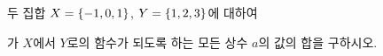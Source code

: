 두 집합 $X=\{-1{,}\mkern3mu\mathopen{}0{,}\mkern3mu\mathopen{}1\}$, $Y=\{1{,}\mkern3mu\mathopen{}2{,}\mkern3mu\mathopen{}3\}$에 대하여\par\smallskip{}\par\smallskip\noindent 가 $X$에서 $Y$로의 함수가 되도록 하는 모든 상수 $a$의 값의 합을 구하시오.
